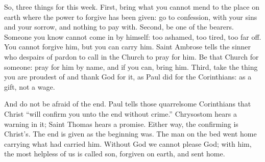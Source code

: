 So, three things for this week. First, bring what you cannot mend to the place
on earth where the power to forgive has been given: go to confession, with
your sins and your sorrow, and nothing to pay with. Second, be one of the
bearers. Someone you know cannot come in by himself: too ashamed, too tired,
too far off. You cannot forgive him, but you can carry him. Saint Ambrose
tells the sinner who despairs of pardon to call in the Church to pray for him.
Be that Church for someone: pray for him by name, and if you can, bring him.
Third, take the thing you are proudest of and thank God for it, as Paul did
for the Corinthians: as a gift, not a wage.

And do not be afraid of the end. Paul tells those quarrelsome Corinthians that
Christ ``will confirm you unto the end without crime.'' Chrysostom hears a
warning in it; Saint Thomas hears a promise. Either way, the confirming is
Christ's. The end is given as the beginning was. The man on the bed went home
carrying what had carried him. Without God we cannot please God; with him, the
most helpless of us is called son, forgiven on earth, and sent home.
